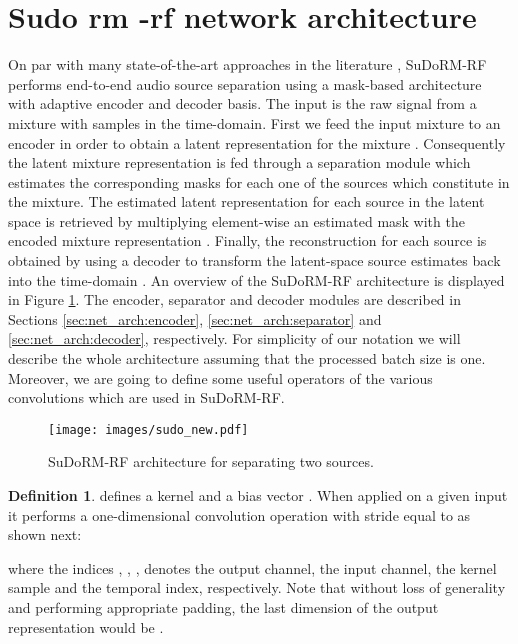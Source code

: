 \documentclass{article}
\theoremstyle{definition}
\newtheorem{definition}{Definition}[section]
\newcommand{\sudo}{SuDoRM-RF }
\newcommand{\sudodot}{SuDoRM-RF}
\begin{document}
\section{Sudo rm -rf network architecture}
\label{sec:net_arch}
On par with many state-of-the-art approaches in the literature \cite{luo2019convTasNet, tzinis2019two, luo2019dual, defossez2019demucs}, \sudo performs end-to-end audio source separation using a mask-based architecture with adaptive encoder and decoder basis. The input is the raw signal from a mixture  with  samples in the time-domain. First we feed the input mixture  to an encoder  in order to obtain a latent representation for the mixture . Consequently the latent mixture representation is fed through a separation module  which estimates the corresponding masks  for each one of the  sources  which constitute in the mixture. The estimated latent representation for each source in the latent space  is retrieved by multiplying element-wise an estimated mask  with the encoded mixture representation . Finally, the reconstruction for each source  is obtained by using a decoder  to transform the latent-space  source estimates back into the time-domain . An overview of the \sudo architecture is displayed in Figure \ref{fig:sudormrf}. The encoder, separator and decoder modules are described in Sections \ref{sec:net_arch:encoder}, \ref{sec:net_arch:separator} and \ref{sec:net_arch:decoder}, respectively. For simplicity of our notation we will describe the whole architecture assuming that the processed batch size is one. Moreover, we are going to define some useful operators of the various convolutions which are used in \sudodot.

\begin{figure}[!htb]
    \centering
      \texttt{[image: images/sudo\_new.pdf]}
      \caption{\sudo architecture for separating two sources.}
      \label{fig:sudormrf}
\end{figure}


\begin{definition}
 defines a kernel  and a bias vector . When applied on a given input  it performs a one-dimensional convolution operation with stride equal to  as shown next:

where the indices , , ,  denotes the output channel, the input channel, the kernel sample and the temporal index, respectively.  Note that without loss of generality and performing appropriate padding, the last dimension of the output representation would be . 
\end{definition}
\end{document}
